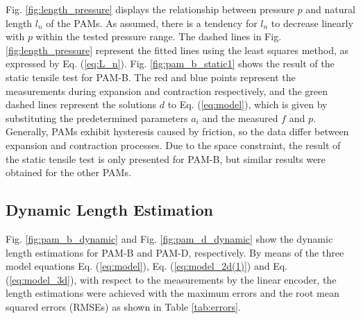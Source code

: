 Fig. \ref{fig:length_pressure} displays the relationship between pressure $p$ and natural length $l_n$ of the PAMs. As assumed, there is a tendency for $l_n$ to decrease linearly with $p$ within the tested pressure range. The dashed lines in Fig. \ref{fig:length_pressure} represent the fitted lines using the least squares method, as expressed by Eq. (\ref{eq:L_n}).
Fig. \ref{fig:pam_b_static1} shows the result of the static tensile test for PAM-B. The red and blue points represent the measurements during expansion and contraction respectively, and the green dashed lines represent the solutions $d$ to Eq. (\ref{eq:model}), which is given by substituting the predetermined parameters $a_i$ and the measured $f$ and $p$.
Generally, PAMs exhibit hysteresis caused by friction, so the data differ between expansion and contraction processes. Due to the space constraint, the result of the static tensile test is only presented for PAM-B, but similar results were obtained for the other PAMs.

\subsection{Dynamic Length Estimation} 
Fig. \ref{fig:pam_b_dynamic} and Fig. \ref{fig:pam_d_dynamic} show the dynamic length estimations for PAM-B and PAM-D, respectively.
By means of the three model equations Eq. (\ref{eq:model}), Eq. (\ref{eq:model_2d(1)}) and Eq. (\ref{eq:model_3d}), with respect to the measurements by the linear encoder, the length estimations were achieved with the maximum errors and the root mean squared errors (RMSEs) as shown in Table \ref{tab:errors}.
   
